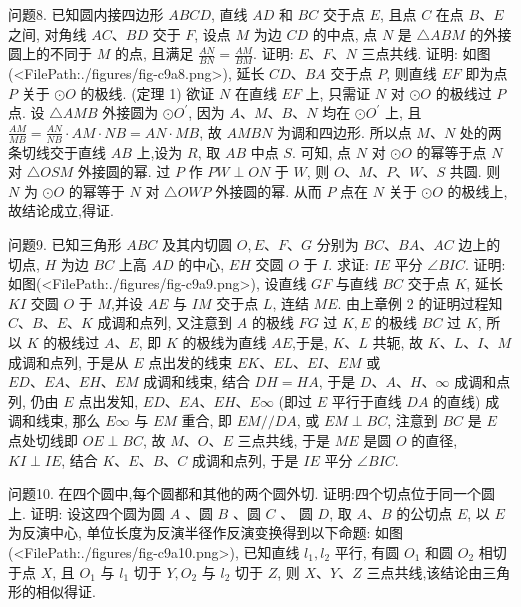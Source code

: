 问题8. 已知圆内接四边形 $A B C D$, 直线 $A D$ 和 $B C$ 交于点 $E$, 且点 $C$ 在点 $B 、 E$ 之间, 对角线 $A C 、 B D$ 交于 $F$, 设点 $M$ 为边 $C D$ 的中点, 点 $N$ 是 $\triangle A B M$ 的外接圆上的不同于 $M$ 的点, 且满足 $\frac{A N}{B N}=\frac{A M}{B M}$. 证明: $E 、 F 、 N$ 三点共线.
证明: 如图(<FilePath:./figures/fig-c9a8.png>), 延长 $C D 、 B A$ 交于点 $P$, 则直线 $E F$ 即为点 $P$ 关于 $\odot O$ 的极线.
(定理 1) 欲证 $N$ 在直线 $E F$ 上, 只需证 $N$ 对 $\odot O$ 的极线过 $P$ 点.
设 $\triangle A M B$ 外接圆为 $\odot O^{\prime}$, 因为 $A 、 M 、 B 、 N$ 均在 $\odot O^{\prime}$ 上, 且 $\frac{A M}{M B}= \frac{A N}{N B} \cdot A M \cdot N B=A N \cdot M B$, 故 $A M B N$ 为调和四边形.
所以点 $M 、 N$
处的两条切线交于直线 $A B$ 上,设为 $R$, 取 $A B$ 中点 $S$.
可知, 点 $N$ 对 $\odot O$ 的幂等于点 $N$ 对 $\triangle O S M$ 外接圆的幂.
过 $P$ 作 $P W \perp O N$ 于 $W$, 则 $O 、 M 、 P 、 W 、 S$ 共圆.
则 $N$ 为 $\odot O$ 的幂等于 $N$ 对 $\triangle O W P$ 外接圆的幂.
从而 $P$ 点在 $N$ 关于 $\odot O$ 的极线上,故结论成立,得证.



问题9. 已知三角形 $A B C$ 及其内切圆 $O, E 、 F 、 G$ 分别为 $B C 、 B A 、 A C$ 边上的切点, $H$ 为边 $B C$ 上高 $A D$ 的中心, $E H$ 交圆 $O$ 于 $I$. 求证: $I E$ 平分 $\angle B I C$.
证明: 如图(<FilePath:./figures/fig-c9a9.png>), 设直线 $G F$ 与直线 $B C$ 交于点 $K$, 延长 $K I$ 交圆 $O$ 于 $M$,并设 $A E$ 与 $I M$ 交于点 $L$, 连结 $M E$. 由上章例 2 的证明过程知 $C 、 B 、 E 、 K$ 成调和点列, 又注意到 $A$ 的极线 $F G$ 过 $K, E$ 的极线 $B C$ 过 $K$, 所以 $K$ 的极线过 $A 、 E$, 即 $K$ 的极线为直线 $A E$,于是, $K 、 L$ 共轭, 故 $K 、 L 、 I 、 M$ 成调和点列, 于是从 $E$ 点出发的线束 $E K 、 E L 、 E I 、 E M$ 或 $E D 、 E A 、 E H 、 E M$ 成调和线束, 结合 $D H=H A$, 于是 $D 、 A 、 H 、 \infty$ 成调和点列, 仍由 $E$ 点出发知, $E D 、 E A 、 E H 、 E \infty$ (即过 $E$ 平行于直线 $D A$ 的直线) 成调和线束, 那么 $E \infty$ 与 $E M$ 重合, 即 $E M / / D A$, 或 $E M \perp B C$, 注意到 $B C$ 是 $E$ 点处切线即 $O E \perp B C$, 故 $M 、 O 、 E$ 三点共线, 于是 $M E$ 是圆 $O$ 的直径, $K I \perp I E$, 结合 $K 、 E 、 B 、 C$ 成调和点列, 于是 $I E$ 平分 $\angle B I C$.



问题10. 在四个圆中,每个圆都和其他的两个圆外切.
证明:四个切点位于同一个圆上.
证明: 设这四个圆为圆 $A$ 、圆 $B$ 、圆 $C$ 、 圆 $D$,
取 $A 、 B$ 的公切点 $E$, 以 $E$ 为反演中心, 单位长度为反演半径作反演变换得到以下命题:
如图(<FilePath:./figures/fig-c9a10.png>), 已知直线 $l_1, l_2$ 平行, 有圆 $O_1$ 和圆 $O_2$ 相切于点 $X$, 且 $O_1$ 与 $l_1$ 切于 $Y, O_2$ 与 $l_2$ 切于 $Z$, 则 $X 、 Y 、 Z$ 三点共线,该结论由三角形的相似得证.



